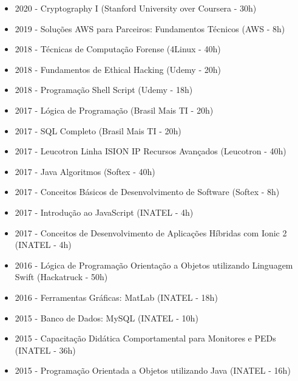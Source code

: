 \documentclass[10pt,a4paper,ragged2e, normalphoto]{altacv}
\begin{document}
\begin{fullwidth}

\begin{itemize}
    \item 2020 - Cryptography I (Stanford University over Coursera - 30h)
    \item 2019 - Soluções AWS para Parceiros: Fundamentos Técnicos (AWS - 8h)
    \item 2018 - Técnicas de Computação Forense (4Linux - 40h)
    \item 2018 - Fundamentos de Ethical Hacking (Udemy - 20h)
    \item 2018 - Programação Shell Script (Udemy - 18h)
    \item 2017 - Lógica de Programação (Brasil Mais TI - 20h)
    \item 2017 - SQL Completo (Brasil Mais TI - 20h)
    \item 2017 - Leucotron Linha ISION IP Recursos Avançados (Leucotron - 40h)
    \item 2017 - Java Algoritmos (Softex - 40h)
    \item 2017 - Conceitos Básicos de Desenvolvimento de Software (Softex - 8h)
    \item 2017 - Introdução ao JavaScript (INATEL - 4h)
    \item 2017 - Conceitos de Desenvolvimento de Aplicações Híbridas com Ionic 2 (INATEL - 4h)
    \item 2016 - Lógica de Programação Orientação a Objetos utilizando Linguagem Swift (Hackatruck - 50h)
    \item 2016 - Ferramentas Gráficas: MatLab (INATEL - 18h)
    \item 2015 - Banco de Dados: MySQL (INATEL - 10h)
    \item 2015 - Capacitação Didática Comportamental para Monitores e PEDs (INATEL - 36h)
    \item 2015 - Programação Orientada a Objetos utilizando Java (INATEL - 16h)
\end{itemize}

\end{fullwidth}
\end{document}
